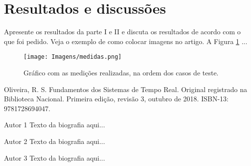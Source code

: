 \documentclass[journal]{IEEEtran}
\begin{document}
\section{Resultados e discussões}

Apresente os resultados da parte I e II e discuta os resultados de acordo com o que foi pedido. Veja o exemplo de como colocar imagens no artigo. A Figura \ref{fig1} ...

	\begin{figure}[h]
	\centering
	\texttt{[image: Imagens/medidas.png]}	
	\caption{Gráfico com as medições realizadas, na ordem dos casos de teste.}
	\label{fig1}
\end{figure}


\ifCLASSOPTIONcaptionsoff
  \newpage
\fi

\begin{thebibliography}{1}

Oliveira, R. S. Fundamentos dos Sistemas de Tempo Real. Original registrado na Biblioteca Nacional. Primeira edição, revisão 3, outubro de 2018. ISBN-13: 9781728694047.

\end{thebibliography}

\begin{IEEEbiography}{Autor 1}
Texto da biografia aqui...
\end{IEEEbiography}

\begin{IEEEbiographynophoto}{Autor 2}
Texto da biografia aqui...
\end{IEEEbiographynophoto}


\begin{IEEEbiographynophoto}{Autor 3}
Texto da biografia aqui...
\end{IEEEbiographynophoto}
\end{document}
